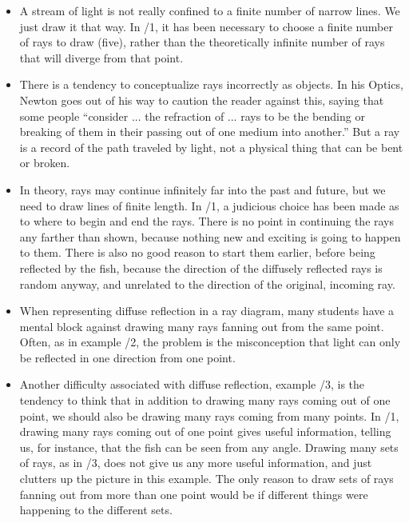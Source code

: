 \begin{itemize}
\item A stream of light is not really confined to a finite
number of narrow lines. We just draw it that way. In /1, it
has been necessary to choose a finite number of rays to draw
(five), rather than the theoretically infinite number of
rays that will diverge from that point.

\item There is a tendency to conceptualize rays incorrectly as
objects. In his Optics, Newton goes out of his way to
caution the reader against this, saying that some people
``consider ... the refraction of ... rays to be the bending
or breaking of them in their passing out of one medium into
another.'' But a ray is a record of the path traveled by
light, not a physical thing that can be bent or broken.

\item In theory, rays may continue infinitely far into the past
and future, but we need to draw lines of finite length. In
/1, a judicious choice has been made as to where to begin
and end the rays. There is no point in continuing the rays
any farther than shown, because nothing new and exciting is
going to happen to them. There is also no good reason to
start them earlier, before being reflected by the fish,
because the direction of the diffusely reflected rays is
random anyway, and unrelated to the direction of the
original, incoming ray.

\item When representing diffuse reflection in a ray diagram,
many students have a mental block against drawing many rays
fanning out from the same point. Often, as in example /2,
the problem is the misconception that light can only be
reflected in one direction from one point.

\item Another difficulty associated with diffuse reflection,
example /3, is the tendency to think that in addition to
drawing many rays coming out of one point, we should also be
drawing many rays coming from many points. In /1, drawing
many rays coming out of one point gives useful information,
telling us, for instance, that the fish can be seen from any
angle. Drawing many sets of rays, as in /3, does not give
us any more useful information, and just clutters up the
picture in this example. The only reason to draw sets of
rays fanning out from more than one point would be if
different things were happening to the different sets.
\end{itemize}

